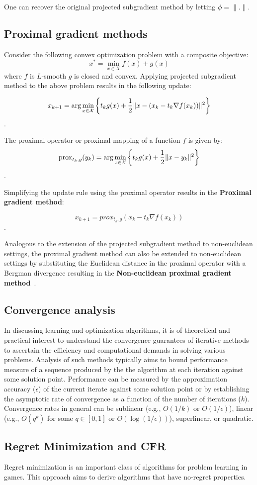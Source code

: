One can recover the original projected subgradient method by letting $\phi=\|.
	\|$.

\subsection{Proximal gradient methods}
Consider the following convex optimization problem with a composite objective:
\begin{equation*}
	x^{\ast} = \min_{x \in X} f(x) + g(x)
\end{equation*} where $f$ is $L$-smooth $g$ is closed and
convex.
Applying projected subgradient method to the above problem results in the following update:

$$ x_{k+1} = \arg \min_{x \in \mathcal{X}} \left\{ t_k g(x) + \frac{1}{2} \| x - (x_k
	- t_k \nabla f(x_k)) \|^2 \right\}$$.

\begin{definition} The
	proximal operator or proximal mapping of a function $f$ is given by:
	$$\text{prox}_{t_k, g}(y_k) = \arg \min_{x \in \mathcal{X}} \left\{ t_k g(x) + \frac{1}{2}\| x - y_k \|^2 \right\} $$.
\end{definition}

Simplifying the update rule using the proximal operator results in the \textbf{Proximal gradient
	method}:

$$ x_{k+1} = prox_{t_k, g}(x_k - t_k \nabla f(x_k))$$.

Analogous to the extension of the projected subgradient method to non-euclidean settings, the proximal
gradient method can also be extended to non-euclidean settings by substituting the Euclidean
distance in the proximal operator with a Bergman divergence resulting in the \textbf{Non-euclidean
	proximal gradient method}~\cite{tsengApproximation2010,beckFirstOrder2017}.

\subsection{Convergence analysis}
In discussing learning and optimization algorithms, it is of theoretical and practical interest to
understand the convergence guarantees of iterative methods to ascertain the efficiency and
computational demands in solving various problems.
Analysis of such methods typically aims to bound performance measure of a sequence produced by the
the algorithm at each iteration against some solution point.
Performance can be measured by the approximation accuracy ($\epsilon$) of the current iterate
against some solution point or by establishing the asymptotic rate of convergence as a function of
the number of iterations ($k$).
Convergence rates in general can be sublinear (e.g., $O(1/k)$ or $O(1/\epsilon)$), linear (e.g.,
$O(q^k)$ for some $q \in [0, 1]$ or $O(\log{(1/\epsilon)})$), superlinear, or quadratic.

\subsection{Regret Minimization and CFR}
Regret minimization is an important class of algorithms for problem learning in games.
This approach aims to derive algorithms that have no-regret properties.
